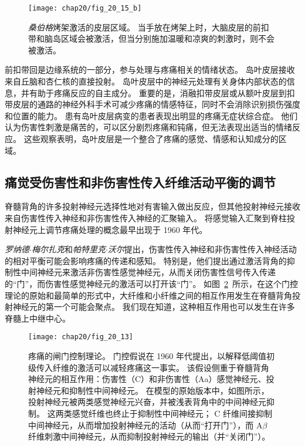 \begin{figure}[htbp]
	\centering
	\texttt{[image: chap20/fig\_20\_15\_b]}
	\caption{\textit{桑伯格}烤架激活的皮层区域。
		当手放在烤架上时，大脑皮层的前扣带和脑岛区域会被激活，但当分别施加温暖和凉爽的刺激时，则不会被激活。}
	\label{fig:20_15_b}
\end{figure}


前扣带回是边缘系统的一部分，参与处理与疼痛相关的情绪状态。
岛叶皮层接收来自丘脑和杏仁核的直接投射。
岛叶皮层中的神经元处理有关身体内部状态的信息，并有助于疼痛反应的自主成分。
重要的是，消融扣带皮层或从额叶皮层到扣带皮层的通路的神经外科手术可减少疼痛的情感特征，同时不会消除识别损伤强度和位置的能力。
患有岛叶皮层病变的患者表现出明显的疼痛无症状综合症。
他们认为伤害性刺激是痛苦的，可以区分剧烈疼痛和钝痛，但无法表现出适当的情绪反应。
这些观察表明，岛叶皮层是一个整合了疼痛的感觉、情感和认知成分的区域。



\subsection{痛觉受伤害性和非伤害性传入纤维活动平衡的调节}

脊髓背角的许多投射神经元选择性地对有害输入做出反应，但其他投射神经元接收来自伤害性传入神经和非伤害性传入神经的汇聚输入。
将感觉输入汇聚到脊柱投射神经元上调节疼痛处理的概念最早出现于 1960 年代。


\textit{罗纳德$\cdot$梅尔扎克}和\textit{帕特里克$\cdot$沃尔}提出，伤害性传入神经和非伤害性传入神经活动的相对平衡可能会影响疼痛的传递和感知。
特别是，他们提出通过激活背角的抑制性中间神经元来激活非伤害性感觉神经元，从而关闭伤害性信号传入传递的“门”，而伤害性感觉神经元的激活可以打开该“门”。 
如图~\ref{fig:20_16}~所示，在这个门控理论的原始和最简单的形式中，大纤维和小纤维之间的相互作用发生在脊髓背角投射神经元的第一个可能会聚点。
我们现在知道，这种相互作用也可以发生在许多脊髓上中继中心。


\begin{figure}[htbp]
	\centering
	\texttt{[image: chap20/fig\_20\_13]}
	\caption{疼痛的闸门控制理论。
		门控假说在 1960 年代提出，以解释低阈值初级传入纤维的激活可以减轻疼痛这一事实。
		该假设侧重于脊髓背角神经元的相互作用：伤害性（C）和非伤害性（Aa）感觉神经元、投射神经元和抑制性中间神经元。
		在模型的原始版本中，如图所示，投射神经元被两类感觉神经元兴奋，并被浅表背角中的中间神经元抑制。 
		这两类感觉纤维也终止于抑制性中间神经元；
		C 纤维间接抑制中间神经元，从而增加投射神经元的活动（从而“打开门”），而 A$ \beta $ 纤维刺激中间神经元，从而抑制投射神经元的输出（并“关闭门”）。}
	\label{fig:20_16}
\end{figure}


